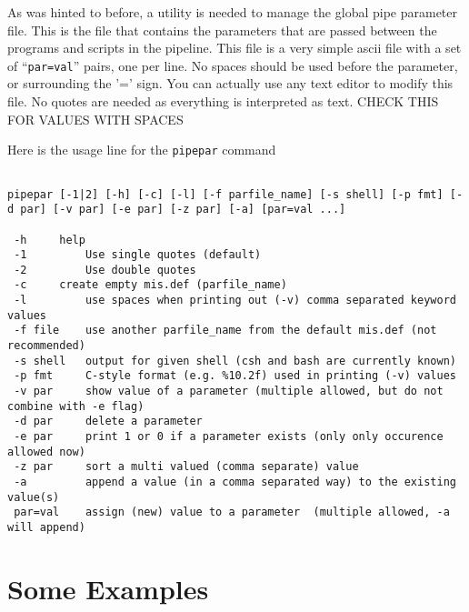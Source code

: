 \documentclass[preprint]{aastex} %
\begin{document}
As was hinted to before, a utility is needed to manage the global
pipe parameter file. This is the file that contains the parameters
that are passed between the programs and scripts
in the pipeline. This file is a very simple ascii file with a
set of ``{\tt par=val}''
pairs, one per line. No spaces should be used before the parameter,
or surrounding the '=' sign. 
You can actually use any text editor to modify this file.
No quotes are needed as everything is interpreted as text.  
CHECK THIS FOR VALUES WITH SPACES

Here is the usage line for the {\tt pipepar} command
\footnotesize
\begin{verbatim}

pipepar [-1|2] [-h] [-c] [-l] [-f parfile_name] [-s shell] [-p fmt] [-d par] [-v par] [-e par] [-z par] [-a] [par=val ...]

 -h	    help
 -1         Use single quotes (default)
 -2         Use double quotes
 -c	    create empty mis.def (parfile_name)
 -l         use spaces when printing out (-v) comma separated keyword values
 -f file    use another parfile_name from the default mis.def (not recommended)
 -s shell   output for given shell (csh and bash are currently known)
 -p fmt     C-style format (e.g. %10.2f) used in printing (-v) values
 -v par	    show value of a parameter (multiple allowed, but do not combine with -e flag)
 -d par     delete a parameter
 -e par     print 1 or 0 if a parameter exists (only only occurence allowed now)
 -z par     sort a multi valued (comma separate) value
 -a         append a value (in a comma separated way) to the existing value(s)
 par=val    assign (new) value to a parameter  (multiple allowed, -a will append)  

\end{verbatim}
\normalsize



\section{Some Examples}
\end{document}
